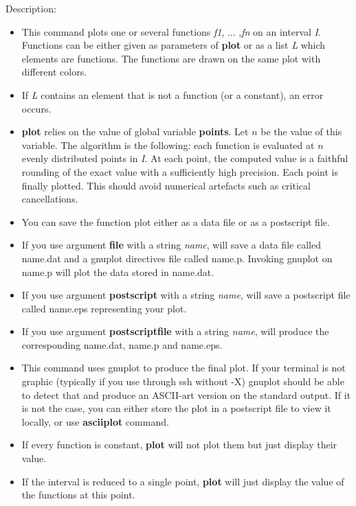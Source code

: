 \noindent Description: \begin{itemize}

\item This command plots one or several functions \emph{f1}, ... ,\emph{fn} on an interval \emph{I}.
   Functions can be either given as parameters of \textbf{plot} or as a list \emph{L}
   which elements are functions.
   The functions are drawn on the same plot with different colors.

\item If \emph{L} contains an element that is not a function (or a constant), an error
   occurs.

\item \textbf{plot} relies on the value of global variable \textbf{points}. Let $n$ be the 
   value of this variable. The algorithm is the following: each function is 
   evaluated at $n$ evenly distributed points in \emph{I}. At each point, the 
   computed value is a faithful rounding of the exact value with a sufficiently
   high precision. Each point is finally plotted.
   This should avoid numerical artefacts such as critical cancellations.

\item You can save the function plot either as a data file or as a postscript file.

\item If you use argument \textbf{file} with a string \emph{name}, \sollya will save a data file
   called name.dat and a gnuplot directives file called name.p. Invoking gnuplot
   on name.p will plot the data stored in name.dat.

\item If you use argument \textbf{postscript} with a string \emph{name}, \sollya will save a 
   postscript file called name.eps representing your plot.

\item If you use argument \textbf{postscriptfile} with a string \emph{name}, \sollya will 
   produce the corresponding name.dat, name.p and name.eps.

\item This command uses gnuplot to produce the final plot.
   If your terminal is not graphic (typically if you use \sollya through 
   ssh without -X)
   gnuplot should be able to detect that and produce an ASCII-art version on the
   standard output. If it is not the case, you can either store the plot in a
   postscript file to view it locally, or use \textbf{asciiplot} command.

\item If every function is constant, \textbf{plot} will not plot them but just display
   their value.

\item If the interval is reduced to a single point, \textbf{plot} will just display the
   value of the functions at this point.
\end{itemize}
